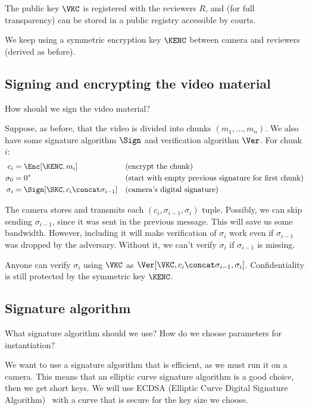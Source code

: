 The public key \(\VKC\) is registered with the reviewers \(R\), and (for full 
transparency) can be stored in a public registry accessible by courts.

We keep using a symmetric encryption key \(\KENC\) between camera and reviewers 
(derived as before).

\subsection{Signing and encrypting the video material}

\begin{exercise}
  How should we sign the video material?
\end{exercise}

Suppose, as before, that the video is divided into chunks \((m_1,\ldots, 
m_n)\).
We also have some signature algorithm \(\Sign\) and verification algorithm 
\(\Ver\).
For chunk \(i\):
\begin{align*}
  c_i     &= \Enc[\KENC, m_i]
          &&\text{(encrypt the chunk)} \\
  \sigma_0 &= 0^*
           &&\text{(start with empty previous signature for first chunk)} \\
  \sigma_i &= \Sign[\SKC, c_i \concat \sigma_{i-1}]
           &&\text{(camera's digital signature)}
\end{align*}

The camera stores and transmits each \((c_i, \sigma_{i-1}, \sigma_i)\) tuple.
Possibly, we can skip sending \(\sigma_{i-1}\), since it was sent in the 
previous message.
This will save us some bandwidth.
However, including it will make verification of \(\sigma_i\) work even if 
\(\sigma_{i-1}\) was dropped by the adversary.
Without it, we can't verify \(\sigma_i\) if \(\sigma_{i-1}\) is missing.

Anyone can verify \(\sigma_i\) using \(\VKC\) as \(\Ver[\VKC, c_i \concat 
\sigma_{i-1}, \sigma_i]\).
Confidentiality is still protected by the symmetric key \(\KENC\).

\subsection{Signature algorithm}

\begin{exercise}
  What signature algorithm should we use?
  How do we choose parameters for instantiation?
\end{exercise}

We want to use a signature algorithm that is efficient, as we must run it on a 
camera.
This means that an elliptic curve signature algorithm is a good choice,
then we get short keys.
We will use ECDSA (Elliptic Curve Digital Signature
Algorithm)~\autocite{FIPS186-5} with a curve that is secure for the key
size we choose.

